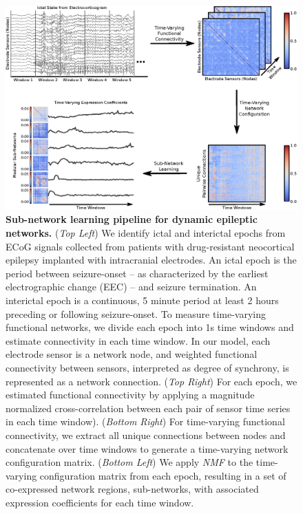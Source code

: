 \begin{figure}[H]
    \centering
    \includegraphics[width=\textwidth]{panel1.eps}
    \caption[Pipeline for disentangling time-varying functional sub-networks]{\textbf{Sub-network learning pipeline for dynamic epileptic networks.} (\textit{Top Left}) We identify ictal and interictal epochs from ECoG signals collected from patients with drug-resistant neocortical epilepsy implanted with intracranial electrodes. An ictal epoch is the period between seizure-onset -- as characterized by the earliest electrographic change (EEC) \cite{litt2001epileptic} -- and seizure termination. An interictal epoch is a continuous, 5 minute period at least 2 hours preceding or following seizure-onset. To measure time-varying functional networks, we divide each epoch into 1s time windows and estimate connectivity in each time window. In our model, each electrode sensor is a network node, and weighted functional connectivity between sensors, interpreted as degree of synchrony, is represented as a network connection. (\textit{Top Right}) For each epoch, we estimated functional connectivity by applying a magnitude normalized cross-correlation between each pair of sensor time series in each time window). (\textit{Bottom Right}) For time-varying functional connectivity, we extract all unique connections between nodes and concatenate over time windows to generate a time-varying network configuration matrix. (\textit{Bottom Left}) We apply \textit{NMF} to the time-varying configuration matrix from each epoch, resulting in a set of co-expressed network regions, sub-networks, with associated expression coefficients for each time window. \label{ch4:fig1}}
\end{figure}

